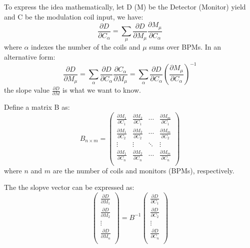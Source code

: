 To express the idea mathematically, let D (M) be the Detector (Monitor) yield and C be
the modulation coil input, we have:
\begin{equation}
    \frac{\partial D}{\partial C_\alpha} = \sum_\mu \frac{\partial D}{\partial M_\mu}\frac{\partial M_\mu}{\partial C_\alpha}
\end{equation}
where $\alpha$ indexes the number of the coils and $\mu$ sums over BPMs. In an alternative form:
\begin{equation}
    \frac{\partial D}{\partial M_\mu} = \sum_\alpha \frac{\partial D}{\partial C_\alpha}\frac{\partial C_\alpha}{\partial M_\mu} = \sum_\alpha \frac{\partial D}{\partial C_\alpha}\left(\frac{\partial M_\mu}{\partial C_\alpha}\right)^{-1}
\end{equation}
the slope value $\frac{\partial D}{\partial M}$ is what we want to know.

Define a matrix B as:
\begin{equation}
    B_{n \times m} = 
    \begin{pmatrix}
	\frac{\partial M_1}{\partial C_1}   & \frac{\partial M_2}{\partial C_1}	& \cdots  & \frac{\partial M_m}{\partial C_1}   \\
	\frac{\partial M_1}{\partial C_2}   & \frac{\partial M_2}{\partial C_2}	& \cdots  & \frac{\partial M_m}{\partial C_2}   \\
	\vdots	& \vdots    & \ddots	& \vdots    \\
	\frac{\partial M_1}{\partial C_n}   & \frac{\partial M_2}{\partial C_n}	& \cdots  & \frac{\partial M_m}{\partial C_n}   \\
    \end{pmatrix}
    \label{eq:B_definition}
\end{equation}
where $n$ and $m$ are the number of coils and monitors (BPMs), respectively.

The the slopve vector can be expressed as:
\begin{equation}
    \begin{pmatrix}
	\frac{\partial D}{\partial M_1}	\\
	\frac{\partial D}{\partial M_2}	\\
	\vdots	\\
	\frac{\partial D}{\partial M_n}	\\
    \end{pmatrix}
    =
    B^{-1}
    \begin{pmatrix}
	\frac{\partial D}{\partial C_1}	\\
	\frac{\partial D}{\partial C_2}	\\
	\vdots	\\
	\frac{\partial D}{\partial C_n}	\\
    \end{pmatrix}
\end{equation}

